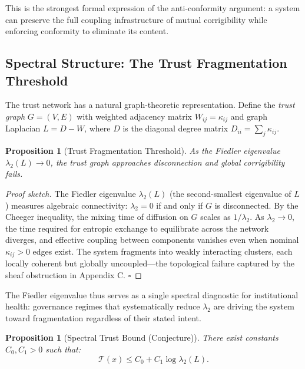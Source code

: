 \documentclass[11pt,a4paper]{article}
\theoremstyle{definition}
\theoremstyle{plain}
\newtheorem{proposition}[theorem]{Proposition}
\begin{document}
\begin{mdframed}[style=appendixbox]
This is the strongest formal expression of the anti-conformity argument: a system can preserve the full coupling infrastructure of mutual corrigibility while enforcing conformity to eliminate its content.

\subsection{Spectral Structure: The Trust Fragmentation Threshold}

The trust network has a natural graph-theoretic representation. Define the \emph{trust graph} $G = (V, E)$ with weighted adjacency matrix $W_{ij} = \kappa_{ij}$ and graph Laplacian $L = D - W$, where $D$ is the diagonal degree matrix $D_{ii} = \sum_j \kappa_{ij}$.

\begin{proposition}[Trust Fragmentation Threshold]
As the Fiedler eigenvalue $\lambda_2(L) \to 0$, the trust graph approaches disconnection and global corrigibility fails.
\end{proposition}

\begin{proof}[Proof sketch]
The Fiedler eigenvalue $\lambda_2(L)$ (the second-smallest eigenvalue of $L$) measures algebraic connectivity: $\lambda_2 = 0$ if and only if $G$ is disconnected. By the Cheeger inequality, the mixing time of diffusion on $G$ scales as $1/\lambda_2$. As $\lambda_2 \to 0$, the time required for entropic exchange to equilibrate across the network diverges, and effective coupling between components vanishes even when nominal $\kappa_{ij} > 0$ edges exist. The system fragments into weakly interacting clusters, each locally coherent but globally uncoupled---the topological failure captured by the sheaf obstruction in Appendix C. $\square$
\end{proof}

The Fiedler eigenvalue thus serves as a single spectral diagnostic for institutional health: governance regimes that systematically reduce $\lambda_2$ are driving the system toward fragmentation regardless of their stated intent.

\begin{proposition}[Spectral Trust Bound (Conjecture)]
There exist constants $C_0, C_1 > 0$ such that:
\begin{equation}
\mathcal{T}(x) \leq C_0 + C_1 \log \lambda_2(L).
\end{equation}
\end{proposition}


\end{mdframed}
\end{document}
